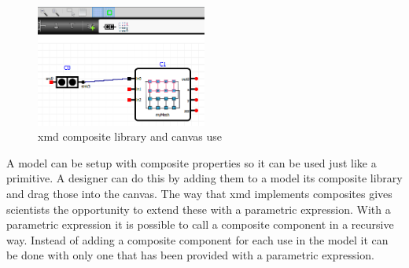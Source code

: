 \begin{figure}
  \vspace{0pt}
  \begin{center}
    \includegraphics[width=0.50\textwidth]{composite-use}
  \end{center}
  \vspace{-10pt}
  \caption{xmd composite library and canvas use}
\label{fig:composite-use}
  \vspace{0pt}
\end{figure}
A model can be setup with composite properties so it can be used just like a
primitive. A designer can do this by adding them to a model its composite
library and drag those into the canvas. The way that xmd implements composites
gives scientists the opportunity to extend these with a parametric expression.
With a parametric expression it is possible to call a composite component in a
recursive way. Instead of adding a composite component for each use in the model
it can be done with only one that has been provided with a parametric expression.

\newpage
